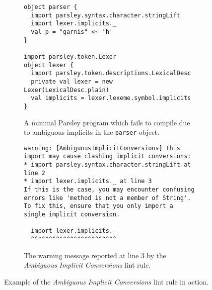 \documentclass[../../main.tex]{subfiles}
\begin{document}
\begin{figure}[htbp]
\begin{subfigure}{\textwidth}
\begin{verbatim}
object parser {
  import parsley.syntax.character.stringLift
  import lexer.implicits._
  val p = "garnis" <~ 'h'
}

import parsley.token.Lexer
object lexer {
  import parsley.token.descriptions.LexicalDesc
  private val lexer = new Lexer(LexicalDesc.plain)
  val implicits = lexer.lexeme.symbol.implicits
}
\end{verbatim}
\caption{A minimal Parsley program which fails to compile due to ambiguous implicits in the \texttt{parser} object.}
\label{fig:ambiguous-implicits-example}
\end{subfigure}
%
\begin{subfigure}{\textwidth}
\vspace{3ex} %
\begin{verbatim}
warning: [AmbiguousImplicitConversions] This import may cause clashing implicit conversions:
* import parsley.syntax.character.stringLift at line 2
* import lexer.implicits._ at line 3
If this is the case, you may encounter confusing errors like 'method is not a member of String'.
To fix this, ensure that you only import a single implicit conversion.

  import lexer.implicits._
  ^^^^^^^^^^^^^^^^^^^^^^^^  
\end{verbatim}
\caption{The warning message reported at line 3 by the \emph{Ambiguous Implicit Conversions} lint rule.}
\label{fig:ambiguous-implicits-warning}
\end{subfigure}
\caption{Example of the \emph{Ambiguous Implicit Conversions} lint rule in action.}
\end{figure}
\end{document}
